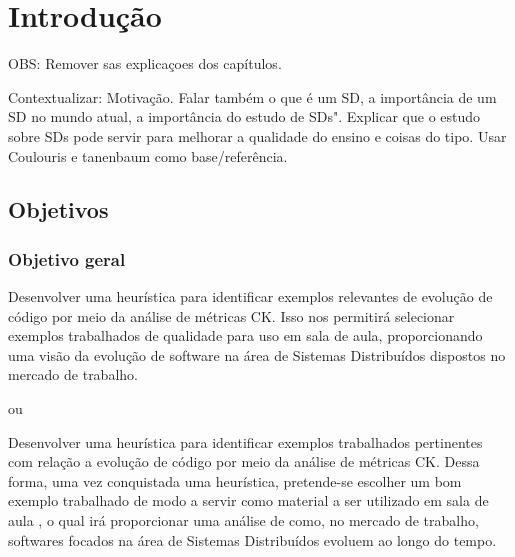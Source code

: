
\chapter{Introdução}\label{cap:introducao}
OBS: Remover sas explicaçoes dos capítulos.

\textbf{}Contextualizar: Motivação. Falar também o que é um SD, a importância de um SD no mundo atual, a importância do estudo de SDs". Explicar que o estudo sobre SDs pode servir para melhorar a qualidade do ensino e coisas do tipo. Usar Coulouris e tanenbaum como base/referência.

\section{Objetivos}\label{sec:objetivos}

\subsection{Objetivo geral}\label{subsec:objetivoGeral}

Desenvolver uma heurística para identificar exemplos relevantes de evolução de código por meio da análise de métricas CK. Isso nos permitirá selecionar exemplos trabalhados de qualidade para uso em sala de aula, proporcionando uma visão da evolução de software na área de Sistemas Distribuídos dispostos no mercado de trabalho.

ou

Desenvolver uma heurística para identificar exemplos trabalhados pertinentes com relação a evolução de código por meio da análise de métricas CK. Dessa forma, uma vez conquistada uma heurística, pretende-se escolher um bom exemplo trabalhado de modo a servir como material a ser utilizado em sala de aula , o qual irá proporcionar uma análise de como, no mercado de trabalho, softwares focados na área de Sistemas Distribuídos evoluem ao longo do tempo.

